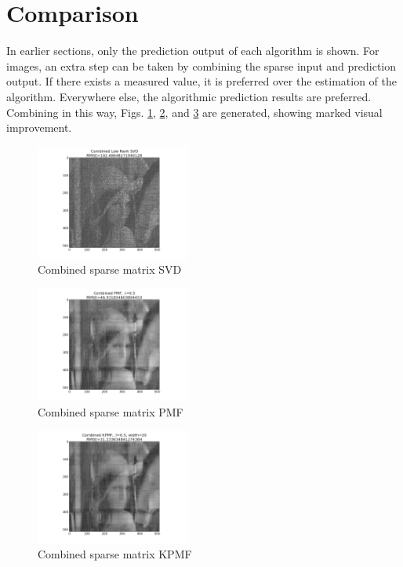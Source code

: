 \documentclass[journal]{IEEEtran}
\begin{document}
\section{Comparison}
In earlier sections, only the prediction output of each algorithm is shown. For images, an extra step can be taken by combining the sparse input and 
prediction output. If there exists a measured value, it is preferred over the estimation of the algorithm. Everywhere else, the algorithmic prediction
results are preferred. Combining in this way, Figs. \ref{fig:combinedsparsesvd}, \ref{fig:combinedpmf}, and \ref{fig:combinedkpmf} are generated, showing
marked visual improvement.
\begin{figure}[h!]
\centering
    \includegraphics[width=0.45\textwidth]{combinedsparsesvd.png}
    \caption{Combined sparse matrix SVD}
    \label{fig:combinedsparsesvd}
\end{figure}
\begin{figure}[h!]
\centering
    \includegraphics[width=0.45\textwidth]{combinedpmf.png}
    \caption{Combined sparse matrix PMF}
    \label{fig:combinedpmf}
\end{figure}
\begin{figure}[h!]
\centering
    \includegraphics[width=0.45\textwidth]{combinedkpmf.png}
    \caption{Combined sparse matrix KPMF}
    \label{fig:combinedkpmf}
\end{figure}
\end{document}
